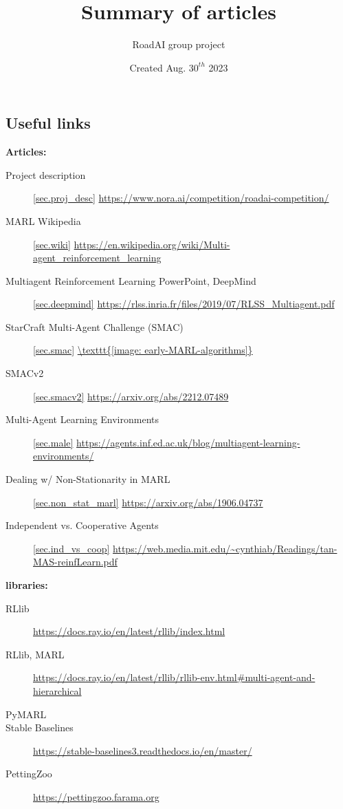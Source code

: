 \documentclass{article}
\title{Summary of articles}
\author{RoadAI group project}
\date{Created Aug. $30^{th}$ 2023}
\begin{document}
\begin{titlepage}
\maketitle
\end{titlepage}

\subsection*{Useful links}    \label{sec.links}
\textbf{Articles:}
\begin{description}
  \item[Project description]\ref{sec.proj_desc} \url{https://www.nora.ai/competition/roadai-competition/}
  \item[MARL Wikipedia]\ref{sec.wiki} \url{https://en.wikipedia.org/wiki/Multi-agent_reinforcement_learning}
  \item[Multiagent Reinforcement Learning PowerPoint, DeepMind]\ref{sec.deepmind} \url{https://rlss.inria.fr/files/2019/07/RLSS_Multiagent.pdf}
  \item[StarCraft Multi-Agent Challenge (SMAC)]\ref{sec.smac} \url{\texttt{[image: early-MARL-algorithms]}}
  \item[SMACv2]\ref{sec.smacv2} \url{https://arxiv.org/abs/2212.07489}
  \item[Multi-Agent Learning Environments]\ref{sec.male} \url{https://agents.inf.ed.ac.uk/blog/multiagent-learning-environments/}
  \item[Dealing w/ Non-Stationarity in MARL] \ref{sec.non_stat_marl} \url{https://arxiv.org/abs/1906.04737}
  \item[Independent vs. Cooperative Agents] \ref{sec.ind_vs_coop} \url{https://web.media.mit.edu/~cynthiab/Readings/tan-MAS-reinfLearn.pdf}
\end{description}

\noindent
\textbf{libraries:}
\begin{description}
  \item[RLlib] \url{https://docs.ray.io/en/latest/rllib/index.html}
  \item[RLlib, MARL] \url{https://docs.ray.io/en/latest/rllib/rllib-env.html#multi-agent-and-hierarchical}
  \item[PyMARL]
  \item[Stable Baselines] \url{https://stable-baselines3.readthedocs.io/en/master/}
  \item[PettingZoo] \url{https://pettingzoo.farama.org}
\end{description}
\end{document}
